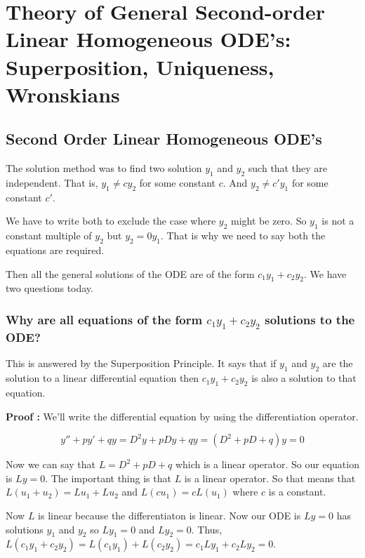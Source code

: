 

\chapter{Theory of General Second-order Linear Homogeneous ODE's: Superposition, Uniqueness, Wronskians}

\bigbreak

\section{Second Order Linear Homogeneous ODE's}

The solution method was to find two solution $y_1$ and $y_2$
such that they are independent.
That is, $y_1 \neq c y_2$ for some constant $c$.
And $y_2 \neq c' y_1$ for some constant $c'$.

We have to write both to exclude the case where $y_2$ might be zero. 
So $y_1$ is not a constant multiple of $y_2$ but $y_2 = 0 y_1$.
That is why we need to say both the equations are required.

Then all the general solutions of the ODE are of the form $c_1 y_1 + c_2 y_2$.
We have two questions today.

\subsection{Why are all equations of the form $c_1 y_1 + c_2 y_2$ solutions to the ODE?}

This is answered by the Superposition Principle.
It says  that if $y_1$ and $y_2$ are the solution to a linear differential equation
then $c_1 y_1 + c_2 y_2$ is also a solution to that equation.

{\bf Proof : } We'll write the differential equation by using the differentiation operator.

$$ y'' + py' + qy = D^2y + pDy + qy = (D^2 + pD + q)y = 0 $$

Now we can say that $L = D^2 + pD + q$ which is a linear operator.
So our equation is $Ly = 0$.
The important thing is that $L$ is a linear operator.
So that means that $L(u_1  + u_2)  = Lu_1 + Lu_2$ and $L(cu_1) = cL(u_1)$  where $c$ is a constant.

Now $L$ is linear because the differentiaton is linear.
Now our ODE is $Ly = 0$ has solutions $y_1$ and $y_2$ so $Ly_1 = 0$ and $Ly_2 = 0$.
Thus, $L(c_1 y_1 + c_2 y_2) = L(c_1 y_1) + L(c_2 y_2) = c_1 L y_1 + c_2 L y_2 = 0$.

